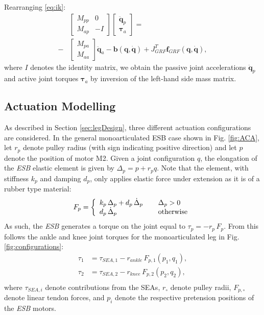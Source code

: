 \documentclass[letterpaper, 10 pt, conference]{ieeeconf}  %
\begin{document}
	Rearranging \eqref{eq:ik}:
	\begin{equation}
	\begin{aligned}
	&\left[\begin{array}{cc}  
	M_{pp} & 0\\
	M_{ap} &-I
	\end{array} \right]
	\left[\begin{array}{c}  
	\mathbf{\ddot q}_p\\
	\boldsymbol{\tau}_a
	\end{array} \right] =\\ 
	-&
	\left[\begin{array}{c}  
	M_{pa}\\
	M_{aa}
	\end{array} \right] 
	\mathbf{\ddot q}_a-
	\mathbf{b(q, \dot q)}+
	J_{GRF}^T \mathbf{f}_{GRF}\mathbf{(q, \dot q)},
	\end{aligned}
	\end{equation}	
	where $I$ denotes the identity matrix, we obtain the passive joint accelerations $\mathbf{\ddot q}_p$ and active joint torques $\boldsymbol{\tau}_a$ by inversion of the left-hand side mass matrix.
	
	
	\subsection{Actuation Modelling}
	\label{subsec:actuationModel}
	As described in Section \ref{sec:legDesign}, three different actuation configurations are considered. In the general monoarticulated ESB case shown in Fig. \ref{fig:ACA}, let $r_p$ denote pulley radius (with sign indicating positive direction) and let $p$ denote the position of motor M2. Given a joint configuration $q$, the elongation of the \textit{ESB} elastic element is given by $\Delta_p = p + r_p q$. Note that the element, with stiffness $k_p$ and damping $d_p$, only applies elastic force under extension as it is of a rubber type material:
	\begin{equation}
	F_p =	\left\lbrace
	\begin{array}{ll}
	k_p \, \Delta_p + d_p \, \dot{\Delta}_p	\hspace{0.4cm} & \Delta_p > 0\\
	d_p \, \dot{\Delta}_p & \text{otherwise}
	\end{array}
	\right.
	\label{eq:F_p}
	\end{equation}   
	As such, the \textit{ESB} generates a torque on the joint equal to $\tau_p = -r_p \, F_p$. From this follows the ankle and knee joint torques for the monoarticulated leg in Fig. \ref{fig:configurations}:
	\begin{equation}
	\begin{aligned}
	\tau_1 &= \tau_{SEA,1} - r_{ankle} \, F_{p,1}(p_1,q_1), \\
	\tau_2 &= \tau_{SEA,2} - r_{knee} \, F_{p,2}(p_2,q_2), \\
	\end{aligned}
	\end{equation}
	where $\tau_{SEA,i}$ denote contributions from the SEAs, $r_\circ$ denote pulley radii, $F_{p,\circ}$ denote linear tendon forces, and $p_i$ denote the respective pretension positions of the \textit{ESB} motors.
	
\end{document}
